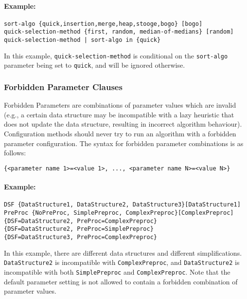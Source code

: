 \documentclass[manual.tex]{subfiles}
\begin{document}
\paragraph{Example:}

\begin{verbatim}
sort-algo {quick,insertion,merge,heap,stooge,bogo} [bogo]
quick-selection-method {first, random, median-of-medians} [random]
quick-selection-method | sort-algo in {quick}
\end{verbatim}
In this example, \texttt{quick-selection-method} is conditional on the \texttt{sort-algo} parameter being set to \texttt{quick}, and will be ignored otherwise.


\subsubsection{Forbidden Parameter Clauses}

Forbidden Parameters are combinations of parameter values which are invalid (e.g., a certain data structure may be incompatible with a lazy heuristic that does not update the data structure, resulting in incorrect algorithm behaviour).
%
Configuration methods should never try to run an algorithm with a forbidden parameter configuration. 
%
The syntax for forbidden parameter combinations is as follows:

\begin{verbatim}
{<parameter name 1>=<value 1>, ..., <parameter name N>=<value N>}
\end{verbatim}

\paragraph{Example:}
\begin{verbatim}
DSF {DataStructure1, DataStructure2, DataStructure3}[DataStructure1]
PreProc {NoPreProc, SimplePreproc, ComplexPreproc}[ComplexPreproc]
{DSF=DataStructure2, PreProc=ComplexPreproc}
{DSF=DataStructure2, PreProc=SimplePreproc}
{DSF=DataStructure3, PreProc=ComplexPreproc}
\end{verbatim}

In this example, there are different data structures and different simplifications.
\texttt{DataStructure2} is incompatible with \texttt{ComplexPreproc}, and 
\texttt{DataStructure2} is incompatible with both \texttt{SimplePreproc} and \texttt{ComplexPreproc}.
Note that the default parameter setting is not allowed to contain a forbidden combination of parameter values.
\end{document}

